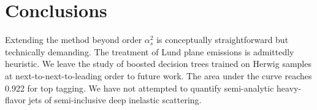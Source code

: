 \section{Conclusions}\label{sec:conclusions}

Extending the method beyond order $\alpha_s^2$ is conceptually
straightforward but technically demanding. The treatment of Lund plane
emissions is admittedly heuristic. We leave the study of boosted
decision trees trained on Herwig samples at next-to-next-to-leading
order to future work. The area under the curve reaches 0.922 for top
tagging. We have not attempted to quantify semi-analytic heavy-flavor
jets of semi-inclusive deep inelastic scattering.

